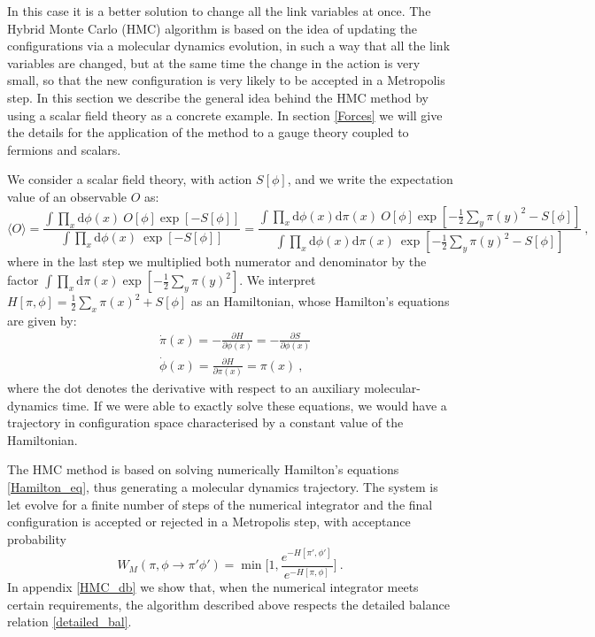 In this case it is a better solution to change all the link variables at once. The Hybrid Monte Carlo (HMC) algorithm is based on the idea of updating the configurations via a molecular dynamics evolution, in such a way that all the link variables are changed, but at the same time the change in the action is very small, so that the new configuration is very likely to be accepted in a Metropolis step.
In this section we describe the general idea behind the HMC method by using a scalar field theory as a concrete example. In section \ref{Forces} we will give the details for the application of the method to a gauge theory coupled to fermions and scalars.

We consider a scalar field theory, with action $S[\phi]$, and we write the expectation value of an observable $O$ as:
\begin{equation}
\langle O \rangle = \frac{\int \prod_{x} \mathrm{d} \phi(x) \: O[\phi] \exp[-S[\phi]]}{\int \prod_{x} \mathrm{d} \phi(x) \: \exp[-S[\phi]]} = \frac{\int \prod_{x} \mathrm{d} \phi(x) \mathrm{d} \pi(x) \: O[\phi] \exp[ - \frac{1}{2} \sum_y \pi(y)^2 -S[\phi]]}{\int \prod_{x}  \mathrm{d} \phi(x) \mathrm{d} \pi(x) \: \exp[ - \frac{1}{2} \sum_y \pi(y)^2 -S[\phi]]} \: ,
\label{O_HMC}
\end{equation}
%
where in the last step we multiplied both numerator and denominator by the factor $\int \prod_x \mathrm{d} \pi(x) \exp[ - \frac{1}{2} \sum_y \pi(y)^2]$. We interpret $H[\pi,\phi] =  \frac{1}{2} \sum_x \pi(x)^2 + S[\phi]$ as an Hamiltonian, whose Hamilton's equations are given by:
\begin{equation}
\begin{split}
& \dot \pi(x) = - \frac{\partial H}{\partial \phi(x)} = - \frac{\partial S}{\partial \phi(x)}\\
& \dot \phi(x) = \frac{\partial H}{\partial \pi(x)} = \pi(x) \: ,
\label{Hamilton_eq} 
\end{split}
\end{equation}
%
where the dot denotes the derivative with respect to an auxiliary molecular-dynamics time. If we were able to exactly solve these equations, we would have a trajectory in configuration space characterised by a constant value of the Hamiltonian.

The HMC method is based on solving numerically Hamilton's equations \ref{Hamilton_eq}, thus generating a molecular dynamics trajectory. The system is let evolve for a finite number of steps of the numerical integrator and the final configuration is accepted or rejected in a Metropolis step, with acceptance probability 
\begin{equation}
W_M(\pi, \phi \to \pi' \phi') = \min \biggl[ 1, \frac{e^{-H[\pi',\phi']}}{e^{-H[\pi,\phi]}} \biggr] \: .
\end{equation}
%
In appendix \ref{HMC_db} we show that, when the numerical integrator meets certain requirements, the algorithm  described above respects the detailed balance relation \ref{detailed_bal}.

